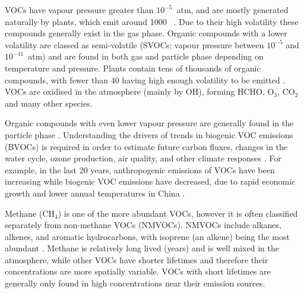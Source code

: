   
  VOCs have vapour pressure greater than $10^{-5}$~atm, and are mostly 
  generated naturally by plants, which emit around 1000\tgpyr 
  ~\parencite{Guenther1995, Glasius2016}.
  Due to their high volatility these compounds generally exist in the gas phase.
  Organic compounds with a lower volatility are classed as semi-volatile (SVOCs: vapour pressure between $10^{-5}$ and $10^{-11}$~atm) and are found in both gas and particle phase depending on temperature and pressure.
  Plants contain tens of thousands of organic compounds, with fewer than 40 having high enough volatility to be emitted \parencite{Guenther2000}.
  VOCs are oxidised in the atmosphere (mainly by OH), forming HCHO, O$_3$, 
  CO$_2$ and many other species.
  
  Organic compounds with even lower vapour pressure are generally found in the 
  particle phase \parencite{Glasius2016}.
  Understanding the drivers of trends in biogenic VOC emissions (BVOCs) is required in order to estimate future carbon fluxes, changes in the water cycle, ozone production, air quality, and other climate responses \parencite{Yue2015}.
  For example, in the last 20 years, anthropogenic emissions of VOCs have been increasing while biogenic VOC emissions have decreased, due to rapid economic growth and lower annual temperatures in China \parencite{Stavrakou2014, Kwon2017}.
  
  Methane (CH$_4$) is one of the more abundant VOCs, however it is often 
  classified separately from non-methane VOCs (NMVOCs).
  NMVOCs include alkanes, alkenes, and aromatic hydrocarbons, with isoprene (an alkene) being the most abundant \parencite{Guenther1995}.
  Methane is relatively long lived (years) and is well mixed in the atmosphere, while other VOCs have shorter lifetimes and therefore their concentrations are more spatially variable.
  VOCs with short lifetimes are generally only found in high concentrations 
  near their emission sources.
  
  
  
  
